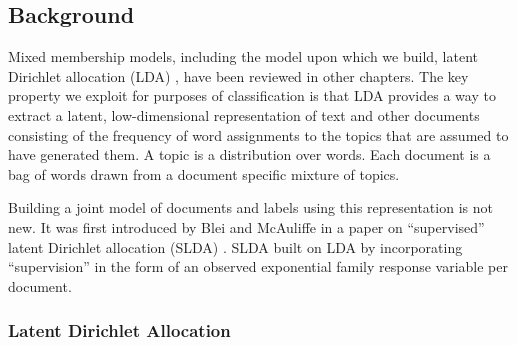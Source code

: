 \subsection{Background}

Mixed membership models, including the model upon which we build, latent Dirichlet allocation (LDA) \cite{Blei2003}, have been reviewed in other chapters.   The key property we exploit for purposes of classification is that LDA %
provides a way to extract a latent, low-dimensional representation of text and other documents consisting of the  frequency of word assignments to the topics that are assumed to have generated them.  A topic is a distribution over words.  Each document is a bag of words drawn from a document specific mixture of topics.  %


Building a joint model of documents and labels using this representation is not new.  It was first introduced by Blei and McAuliffe in a paper on 
 ``supervised'' latent Dirichlet allocation (SLDA) \cite{BleiMcAuliffe2008}.  SLDA built on LDA by incorporating
``supervision'' in the form of an observed exponential family response 
variable per document.  

\subsubsection{Latent Dirichlet Allocation}


